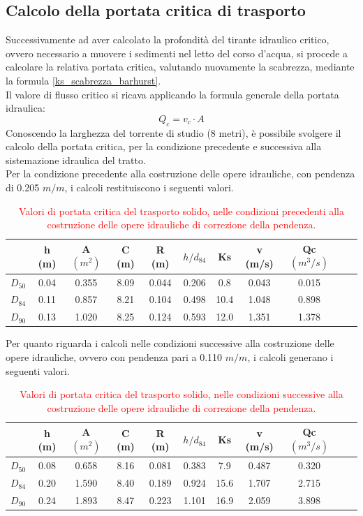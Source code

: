 \subsection{Calcolo della portata critica di trasporto}
Successivamente ad aver calcolato la profondità del tirante idraulico critico, ovvero necessario a muovere i sedimenti nel letto del corso d'acqua, si procede a calcolare la relativa portata critica, valutando nuovamente la scabrezza, mediante la formula \ref{ks_scabrezza_barhurst}.\\
Il valore di flusso critico si ricava applicando la formula generale della portata idraulica:
\begin{equation}
    Q_c = v_c \cdot A
\end{equation}
Conoscendo la larghezza del torrente di studio (8 metri), è possibile svolgere il calcolo della portata critica, per la condizione precedente e successiva alla sistemazione idraulica del tratto.\\
Per la condizione precedente alla costruzione delle opere idrauliche, con pendenza di 0.205 $m/m$, i calcoli restituiscono i seguenti valori.
\begin{table}[H] \centering
\caption{\textcolor{red}{Valori di portata critica del trasporto solido, nelle condizioni precedenti alla costruzione delle opere idrauliche di correzione della pendenza.}}
\begin{tabular}{ccccccccccc}
\toprule
& h (m) & A $(m^2)$ & C (m) & R (m) & $h/d_{84}$ & Ks& v (m/s)& Qc $(m^3/s)$ \\
\midrule
$D_{50}$& 0.04 & 0.355 & 8.09  & 0.044 & 0.206 & 0.8  & 0.043 & 0.015 \\
$D_{84}$ & 0.11 & 0.857 & 8.21 & 0.104 & 0.498 & 10.4 & 1.048   & 0.898 \\
$D_{90}$ & 0.13  & 1.020  & 8.25 & 0.124 & 0.593 & 12.0 & 1.351 & 1.378 \\
\bottomrule
\end{tabular}
\end{table}

Per quanto riguarda i calcoli nelle condizioni successive alla costruzione delle opere idrauliche, ovvero con pendenza pari a 0.110 $m/m$, i calcoli generano i seguenti valori.
\begin{table}[H] \centering
\caption{\textcolor{red}{Valori di portata critica del trasporto solido, nelle condizioni successive alla costruzione delle opere idrauliche di correzione della pendenza.}}
\begin{tabular}{ccccccccccc}
\toprule
& h (m) & A $(m^2)$ & C (m) & R (m) & $h/d_{84}$ & Ks& v (m/s)& Qc $(m^3/s)$ \\
\midrule
$D_{50}$& 0.08  & 0.658  & 8.16  & 0.081 & 0.383 & 7.9 & 0.487 & 0.320\\
$D_{84}$ & 0.20 & 1.590  & 8.40  & 0.189 & 0.924 & 15.6 & 1.707 & 2.715 \\
$D_{90}$ & 0.24  & 1.893  & 8.47 & 0.223 & 1.101 & 16.9 & 2.059 & 3.898 \\
\bottomrule
\end{tabular}
\end{table}

